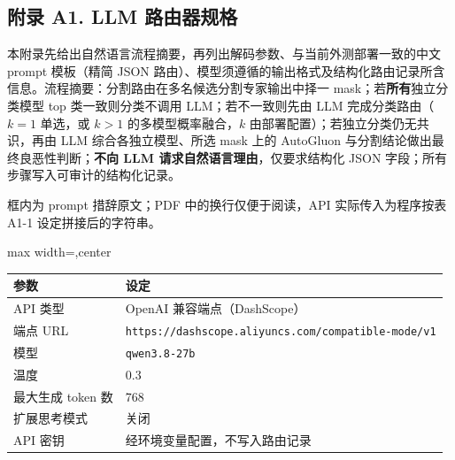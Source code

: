



\responseproseappendixstart
\subsection*{附录 A1. LLM 路由器规格}
\label{app:A1}
\begin{responseappendixprose}
\noindent 本附录先给出自然语言流程摘要，再列出解码参数、与当前外测部署一致的中文 prompt 模板（精简 JSON 路由）、模型须遵循的输出格式及结构化路由记录所含信息。流程摘要：分割路由在多名候选分割专家输出中择一 mask；若\textbf{所有}独立分类模型 top 类一致则分类不调用 LLM；若不一致则先由 LLM 完成分类路由（$k{=}1$ 单选，或 $k>1$ 的多模型概率融合，$k$ 由部署配置）；若独立分类仍无共识，再由 LLM 综合各独立模型、所选 mask 上的 AutoGluon 与分割结论做出最终良恶性判断；\textbf{不向 LLM 请求自然语言理由}，仅要求结构化 JSON 字段；所有步骤写入可审计的结构化记录。
\par\noindent 框内为 prompt 措辞原文；PDF 中的换行仅便于阅读，API 实际传入为程序按表 A1-1 设定拼接后的字符串。
\par
\begin{responseinlinetable}
\label{tab_A1_decode}
\begin{adjustbox}{max width=\textwidth,center}
\begin{tabular}{ll}
\toprule
参数 & 设定 \\
\midrule
API 类型 & OpenAI 兼容端点（DashScope） \\
端点 URL & \texttt{https://dashscope.aliyuncs.com/compatible-mode/v1} \\
模型 & \texttt{qwen3.8-27b} \\
温度 & 0.3 \\
最大生成 token 数 & 768 \\
扩展思考模式 & 关闭 \\
API 密钥 & 经环境变量配置，不写入路由记录 \\
\bottomrule
\end{tabular}
\end{adjustbox}
\end{responseinlinetable}


\end{responseappendixprose}
